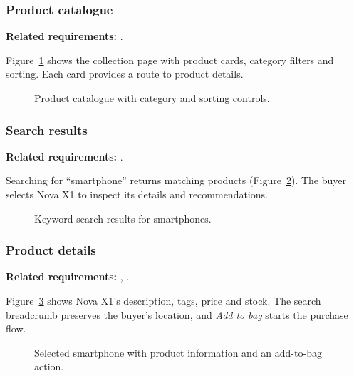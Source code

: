 \begin{samepage}
\subsubsection{Product catalogue}
\label{sec:prototype-catalogue-view}

\textbf{Related requirements:} .

Figure~\ref{fig:prototype-catalogue} shows the collection page with product cards,
category filters and sorting. Each card provides a route to product details.

\nopagebreak[4]
\begin{figure}[H]
  \centering
  \caption{Product catalogue with category and sorting controls.}
  \label{fig:prototype-catalogue}
\end{figure}
\end{samepage}

\begin{samepage}
\subsubsection{Search results}
\label{sec:prototype-search-view}

\textbf{Related requirements:} .

Searching for ``smartphone'' returns matching products
(Figure~\ref{fig:prototype-search-results}). The buyer selects Nova X1 to inspect
its details and recommendations.

\nopagebreak[4]
\begin{figure}[H]
  \centering
  \caption{Keyword search results for smartphones.}
  \label{fig:prototype-search-results}
\end{figure}
\end{samepage}

\begin{samepage}
\subsubsection{Product details}
\label{sec:prototype-product-detail-view}

\textbf{Related requirements:} , .

Figure~\ref{fig:prototype-product-detail} shows Nova X1's description, tags, price
and stock. The search breadcrumb preserves the buyer's location, and
\emph{Add to bag} starts the purchase flow.

\nopagebreak[4]
\begin{figure}[H]
  \centering
  \caption{Selected smartphone with product information and an add-to-bag action.}
  \label{fig:prototype-product-detail}
\end{figure}
\end{samepage}

